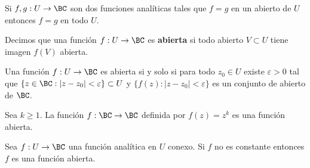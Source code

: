 \begin{theorem}
  Si $f, g: U \to \BC$ son dos funciones anal\'iticas tales que $f = g$ en un abierto de $U$
  entonces $f = g$ en todo $U$.
\end{theorem}

Decimos que una funci\'on $f: U \to \BC$ es \textbf{abierta} si todo abierto $V \subset U$ tiene imagen
$f(V)$ abierta.

\begin{theorem}
  Una funci\'on $f: U \to \BC$ es abierta si y solo si para todo $z_0 \in U$ existe
  $\varepsilon > 0$ tal que $\{z \in \BC: |z - z_0| < \varepsilon\} \subset U$ y
  $\{f(z): |z - z_0| < \varepsilon\}$ es un conjunto de abierto de $\BC$.
\end{theorem}

\begin{example}
  Sea $k \geq 1$. La funci\'on $f: \BC \to \BC$ definida por $f(z) = z^k$ es una funci\'on abierta.
\end{example}

\begin{theorem}
  Sea $f: U \to \BC$ una funci\'on anal\'itica en $U$ conexo.
  Si $f$ no es constante entonces $f$ es una funci\'on abierta.
\end{theorem}